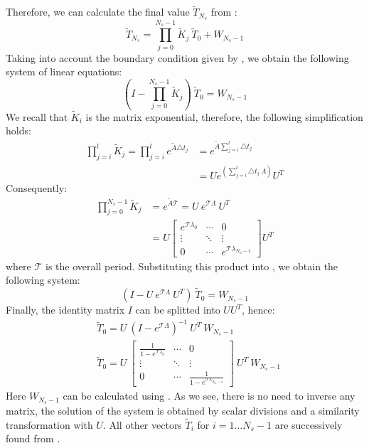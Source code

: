 Therefore, we can calculate the final value $\tilde{T}_{N_s}$ from :
\[
  \tilde{T}_{N_s} = \prod_{j = 0}^{N_s - 1} \tilde{K}_j \: \tilde{T}_0 + W_{N_s - 1}
\]
Taking into account the boundary condition given by , we obtain the following system of linear equations:
\begin{equation} \label{eq:core-system}
  (I - \prod_{j = 0}^{N_s - 1} \tilde{K}_j) \: \tilde{T}_0 = W_{N_s - 1}
\end{equation}
We recall that $\tilde{K}_i$ is the matrix exponential, therefore, the following simplification holds:
\begin{align*}
  \prod_{j = i}^l \tilde{K}_j = \prod_{j = i}^l e^{\tilde{A} \triangle t_j} & = e^{\tilde{A} \sum_{j = i}^l \triangle t_j} \\
  & = U e^{\left( \sum_{j = i}^l \triangle t_j \: \Lambda \right)} U^T
\end{align*}
Consequently:
\begin{align*}
  \prod_{j = 0}^{N_s - 1} \tilde{K}_j & = e^{\tilde{A} \mathcal{T}} = U \: e^{\mathcal{T} \Lambda} \: U^T \\
    & = U \left[
      \begin{array}{ccc}
        e^{\mathcal{T} \lambda_0} & \cdots & 0 \\
        \vdots & \ddots & \vdots \\
        0 & \cdots & e^{\mathcal{T} \lambda_{N_n - 1}}
      \end{array}
    \right] U^T
\end{align*}
where $\mathcal{T}$ is the overall period. Substituting this product into , we obtain the following system:
\[
  (I - U \: e^{\mathcal{T} \Lambda} \: U^T) \: \tilde{T}_0 = W_{N_s - 1}
\]
Finally, the identity matrix $I$ can be splitted into $U U^T$, hence:
\begin{align*}
  & \tilde{T}_0 = U \: (I - e^{\mathcal{T} \Lambda})^{-1} \: U^T \: W_{N_s - 1} \\
  & \tilde{T}_0 = U \: \left[
      \begin{array}{ccc}
        \frac{1}{1 - e^{\mathcal{T} \lambda_0}} & \cdots & 0 \\
        \vdots & \ddots & \vdots \\
        0 & \cdots & \frac{1}{1 - e^{\mathcal{T} \lambda_{N_n - 1}}}
      \end{array}
    \right] \: U^T \: W_{N_s - 1}
\end{align*}
Here $W_{N_s - 1}$ can be calculated using . As we see, there is no need to inverse any matrix, the solution of the system is obtained by scalar divisions and a similarity transformation with $U$. All other vectors $\tilde{T}_i$ for $i = 1 \dots N_s - 1$ are successively found from .

